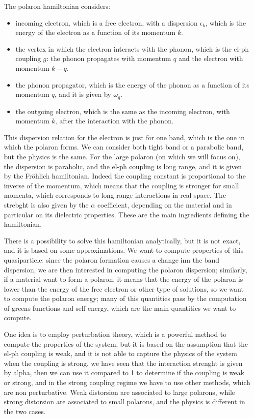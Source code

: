 The polaron hamiltonian considers:
\begin{itemize}
    \item incoming electron, which is a free electron, with a dispersion \(\epsilon_k\), which is the energy of the electron as a function of its momentum \(k\).
    \item the vertex in which the electron interacts with the phonon, which is the el-ph coupling \(g\): the phonon propagates with momentum \(q\) and the electron with momentum \(k-q\).
    \item the phonon propagator, which is the energy of the phonon as a function of its momentum \(q\), and it is given by \(\omega_q\).
    \item the outgoing electron, which is the same as the incoming electron, with momentum \(k\), after the interaction with the phonon.
\end{itemize}
This dispersion relation for the electron is just for one band, which is the one in which the polaron forms. We can consider both tight band or a parabolic band, but the physics is the same. For the large polaron (on which we will focus on), the dispersion is parabolic, and the el-ph coupling is long range, and it is given by the Fröhlich hamiltonian. Indeed the coupling constant is proportional to the inverse of the momentum, which means that the coupling is stronger for small momenta, which corresponds to long range interactions in real space. The strebght is also given by the \(\alpha\) coefficient, depending on the material and in particular on its dielectric properties. These are the main ingredients defining the hamiltonian.

There is a possibility to solve this hamiltonian analytically, but it is not exact, and it is based on some approximations. We want to compute properties of this quasiparticle: since the polaron formation causes a change inn the band dispersion, we are then interested in computing the polaron dispersion; similarly, if a material want to form a polaron, it means that the energy of the polaron is lower than the energy of the free electron or other type of solutions, so we want to compute the polaron energy; many of this quantities pass by the computation of greens functions and self energy, which are the main quantities we want to compute.

One idea is to employ perturbation theory, which is a powerful method to compute the properties of the system, but it is based on the assumption that the el-ph coupling is weak, and it is not able to capture the physics of the system when the coupling is strong. we have seen that the interaction strenght is given by alpha, then we can use it compared to 1 to determine if the coupling is weak or strong, and in the strong coupling regime we have to use other methods, which are non perturbative. Weak distorsion are associated to large polarons, while strong distorsion are associated to small polarons, and the physics is different in the two cases.

